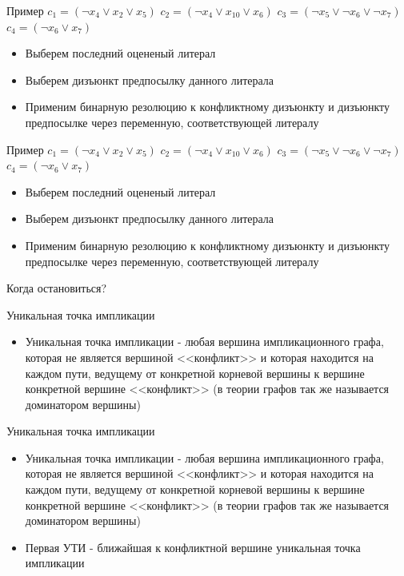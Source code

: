 \documentclass{beamer}
\begin{document}
\begin{frame}{Пример}
$c_1 = (\lnot x_4 \vee x_2 \vee x_5)$\newline
$c_2 = (\lnot x_4 \vee x_{10} \vee x_6)$\newline
$c_3 = (\lnot x_5 \vee \lnot x_6 \vee \lnot x_7)$\newline
$c_4 = (\lnot x_6 \vee x_7)$\newline
\begin{itemize}
\item Выберем последний оцененый литерал
\item Выберем дизъюнкт предпосылку данного литерала
\item Применим бинарную резолюцию к конфликтному дизъюнкту и дизъюнкту предпосылке через переменную, соответствующей литералу
\end{itemize}
\end{frame}

\begin{frame}{Пример}
$c_1 = (\lnot x_4 \vee x_2 \vee x_5)$\newline
$c_2 = (\lnot x_4 \vee x_{10} \vee x_6)$\newline
$c_3 = (\lnot x_5 \vee \lnot x_6 \vee \lnot x_7)$\newline
$c_4 = (\lnot x_6 \vee x_7)$\newline
\begin{itemize}
\item Выберем последний оцененый литерал
\item Выберем дизъюнкт предпосылку данного литерала
\item Применим бинарную резолюцию к конфликтному дизъюнкту и дизъюнкту предпосылке через переменную, соответствующей литералу
\end{itemize}
Когда остановиться?
\end{frame}

\begin{frame}{Уникальная точка импликации}
\begin{itemize}
\item Уникальная точка импликации - любая вершина импликационного графа, которая не является вершиной <<конфликт>> и которая
находится на каждом пути, ведущему от конкретной корневой вершины к вершине конкретной вершине <<конфликт>> (в теории графов так
же называется доминатором вершины)
\end{itemize}
\end{frame}

\begin{frame}{Уникальная точка импликации}
\begin{itemize}
\item Уникальная точка импликации - любая вершина импликационного графа, которая не является вершиной <<конфликт>> и которая
находится на каждом пути, ведущему от конкретной корневой вершины к вершине конкретной вершине <<конфликт>> (в теории графов так
же называется доминатором вершины)
\item Первая УТИ - ближайшая к конфликтной вершине уникальная точка импликации
\end{itemize}
\end{frame}
\end{document}
